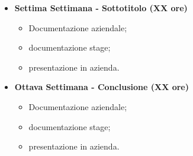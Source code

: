 {\begin{itemize}
\begin{itemize}
\begin{itemize}
            	\item connessione alla rete;
            	\item creare transazioni;
            	\item firmare transazioni;
            	\item diventare parte della rete;
            	\item connessione con altre reti.
            \end{itemize}
        \end{itemize}
        \item \textbf{Settima Settimana - Sottotitolo (XX ore)} 
        \begin{itemize}
            \item Documentazione aziendale;
            \item documentazione stage;
            \item presentazione in azienda.
        \end{itemize}
        \item \textbf{Ottava Settimana - Conclusione (XX ore)} 
        \begin{itemize}
            \item Documentazione aziendale;
            \item documentazione stage;
            \item presentazione in azienda.
        \end{itemize}
    \end{itemize}
}

\newcommand{\totaleOre}{}

\newcommand{\obiettiviObbligatori}{
	 \item \textbf{RO-1:} primo obiettivo;
	 \item \textbf{RO-2:} secondo obiettivo;
	 \item \textbf{RO-3:} terzo obiettivo.
}

\newcommand{\obiettiviDesiderabili}{
	 \item \textbf{RD-1:} primo obiettivo;
	 \item \textbf{RD-2:} secondo obiettivo.
}

\newcommand{\obiettiviFacoltativi}{
	 \item \textbf{RF-1:} primo obiettivo;
	 \item \textbf{RF-2:} secondo obiettivo;
	 \item \textbf{RF-3:} terzo obiettivo.
}
